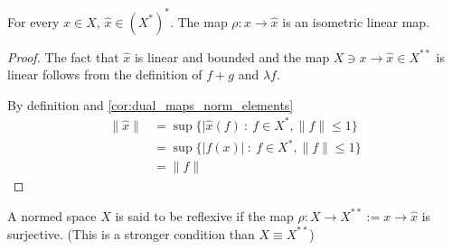 \begin{theorem}
  \label{InclusionToDoubleDualisIsometric}
  For every $x \in X$, $\hat{ x } \in (X^{*})^{*}$. The map $\rho: x
  \to \hat{x}$ is an isometric linear map.
\end{theorem}
\begin{proof}
  The fact that $ \hat{x}$ is linear and bounded and the map $X \ni x
  \to \hat{x} \in X^{**}$ is linear follows from the definition of
  $f+g$ and $\lambda f$.

  By definition and   \autoref{cor:dual_maps_norm_elements}
  \begin{align*}
    \|\hat{x}\| &= \sup \{ |\hat{x}(f) \ : \ f \in X^{*}, \|f\| \le 1 \} \\
    & = \sup \{ |f(x)| \ : \ f \in X^{*}, \|f\| \le 1 \} \\
    & = \|f\|
  \end{align*}
\end{proof}

\begin{definition}
  A normed space $X$ is said to be reflexive if the map $\rho: X \to
  X^{**}:= x \to \hat{x}$ is surjective. (This is a stronger
  condition than $X \equiv X^{**}$)
\end{definition}

